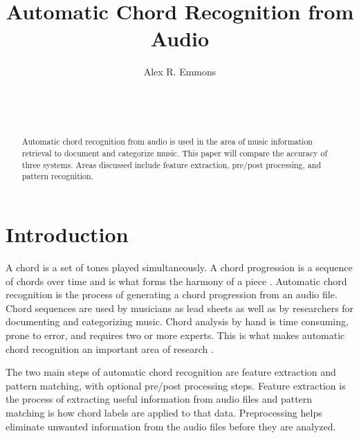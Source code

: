\documentclass{sig-alternate}
\begin{document}

\title{Automatic Chord Recognition from Audio}


\author{
\alignauthor
Alex R. Emmons\\
	\\
	\\
	\\
}

\maketitle
\begin{abstract}
Automatic chord recognition from audio is used in the area of music information retrieval to document and categorize music. This paper will compare the accuracy of three systems. Areas discussed include feature extraction, pre/post processing, and pattern recognition.
\end{abstract}


\section{Introduction}
A chord is a set of tones played simultaneously. A chord progression is a sequence of chords over time and is what forms the harmony of a piece \cite{Lee:2006}. Automatic chord recognition is the process of generating a chord progression from an audio file. Chord sequences are used by musicians as lead sheets as well as by researchers for documenting and categorizing music. Chord analysis by hand is time consuming, prone to error, and requires two or more experts. This is what makes automatic chord recognition an important area of research \cite{McVicar:2014}.

The two main steps of automatic chord recognition are feature extraction and pattern matching, with optional pre/post processing steps. Feature extraction is the process of extracting useful information from audio files and pattern matching is how chord labels are applied to that data. Preprocessing helps eliminate unwanted information from the audio files before they are analyzed.
\end{document}
